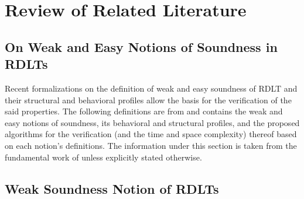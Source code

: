 \chapter{Review of Related Literature}
\section*{On Weak and Easy Notions of Soundness in RDLTs}
Recent formalizations on the definition of weak and easy soundness of RDLT and their structural and behavioral profiles allow the basis for the verification of the said properties. The following definitions are from \cite{Ramirez2024} and contains the weak and easy notions of soundness, its behavioral and structural profiles, and the proposed algorithms for the verification (and the time and space complexity) thereof based on each notion's definitions.
The information under this section is taken from the fundamental work of \cite{Ramirez2024} unless explicitly stated otherwise.
\section{Weak Soundness Notion of RDLTs}

